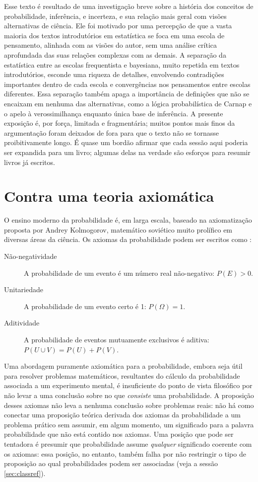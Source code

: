 Esse texto é resultado de uma investigação breve sobre a história dos conceitos de probabilidade, inferência, e incerteza,
e sua relação mais geral com visões alternativas de ciência. Ele foi motivado por uma percepção de que a vasta maioria dos
textos introdutórios em estatística se foca em uma escola de pensamento, alinhada com as visões do autor, sem uma análise crítica
aprofundada das suas relações complexas com as demais. A separação da estatística entre as escolas frequentista e bayesiana,
muito repetida em textos introdutórios, esconde uma riqueza de detalhes, envolvendo contradições importantes dentro de cada
escola e convergências nos pensamentos entre escolas diferentes. Essa separação também apaga a importância de definições que
não se encaixam em nenhuma das alternativas, como a lógica probabilística de Carnap e o apelo à verossimilhança enquanto 
única base de inferência. A presente exposição é, por força, limitada e fragmentária; muitos pontos mais finos da argumentação
foram deixados de fora para que o texto não se tornasse proibitivamente longo. É quase um bordão afirmar que cada 
sessão aqui poderia ser expandida para um livro; algumas delas na verdade são esforços para resumir livros já escritos.

\section{Contra uma teoria axiomática}\label{sec:axiomatica}
O ensino moderno da probabilidade é, em larga escala, baseado na axiomatização proposta por Andrey Kolmogorov, matemático
soviético muito prolífico em diversas áreas da ciência. Os axiomas da probabilidade podem ser escritos como \citep{Morettin09}:

\begin{description}
	\item[Não-negatividade] A probabilidade de um evento é um número real não-negativo: $P(E) > 0$.
	\item[Unitariedade] A probabilidade de um evento certo é 1: $P(\Omega) = 1$.
	\item[Aditividade] A probabilidade de eventos mutuamente exclusivos é aditiva: $P(U \cup V) = P(U)+P(V)$.
\end{description}

Uma abordagem puramente axiomática para a probabilidade, embora seja útil para resolver problemas matemáticos, resultantes do
cálculo da probabilidade associada a um experimento mental, é insuficiente do ponto de vista filosófico por não 
levar a uma conclusão sobre no que {\em consiste} uma probabilidade. A proposição desses axiomas não leva a nenhuma conclusão 
sobre problemas reais: não há como conectar uma proposição teórica derivada dos axiomas da probabilidade a um problema
prático sem assumir, em algum momento, um significado para a palavra probabilidade que não está contido nos axiomas. Uma posição
que pode ser tentadora é presumir que probabilidade assume {\em qualquer} significado coerente com os axiomas: essa posição,
no entanto, também falha por não restringir o tipo de proposição ao qual probabilidades podem ser associadas (veja a sessão
\ref{sec:classref}). 

